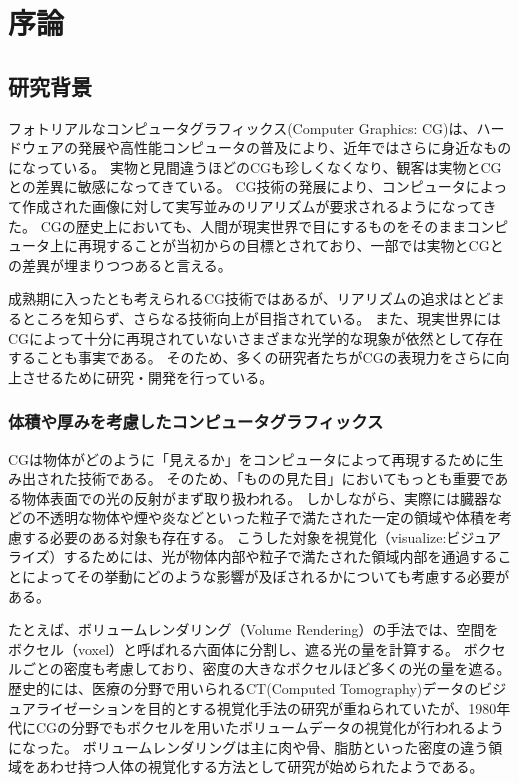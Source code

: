 \chapter{序論}
\label{CBegin}

\section{研究背景}
\label{SBackground}

フォトリアルなコンピュータグラフィックス(Computer Graphics: CG)は、ハードウェアの発展や高性能コンピュータの普及により、近年ではさらに身近なものになっている。
実物と見間違うほどのCGも珍しくなくなり、観客は実物とCGとの差異に敏感になってきている。
CG技術の発展により、コンピュータによって作成された画像に対して実写並みのリアリズムが要求されるようになってきた。
CGの歴史上においても、人間が現実世界で目にするものをそのままコンピュータ上に再現することが当初からの目標とされており、一部では実物とCGとの差異が埋まりつつあると言える。

成熟期に入ったとも考えられるCG技術ではあるが、リアリズムの追求はとどまるところを知らず、さらなる技術向上が目指されている。
また、現実世界にはCGによって十分に再現されていないさまざまな光学的な現象が依然として存在することも事実である。
そのため、多くの研究者たちがCGの表現力をさらに向上させるために研究・開発を行っている。


\subsection{体積や厚みを考慮したコンピュータグラフィックス}
\label{SSVolumerendering}

CGは物体がどのように「見えるか」をコンピュータによって再現するために生み出された技術である。
そのため、「ものの見た目」においてもっとも重要である物体表面での光の反射がまず取り扱われる。
しかしながら、実際には臓器などの不透明な物体や煙や炎などといった粒子で満たされた一定の領域や体積を考慮する必要のある対象も存在する。
こうした対象を視覚化（visualize:ビジュアライズ）するためには、光が物体内部や粒子で満たされた領域内部を通過することによってその挙動にどのような影響が及ぼされるかについても考慮する必要がある。

たとえば、ボリュームレンダリング（Volume Rendering）の手法では、空間をボクセル（voxel）と呼ばれる六面体に分割し、遮る光の量を計算する。
ボクセルごとの密度も考慮しており、密度の大きなボクセルほど多くの光の量を遮る。
歴史的には、医療の分野で用いられるCT(Computed Tomography)データのビジュアライゼーションを目的とする視覚化手法の研究が重ねられていたが\cite{}、1980年代にCGの分野でもボクセルを用いたボリュームデータの視覚化が行われるようになった\cite{}。
ボリュームレンダリングは主に肉や骨、脂肪といった密度の違う領域をあわせ持つ人体の視覚化する方法として研究が始められたようである。

